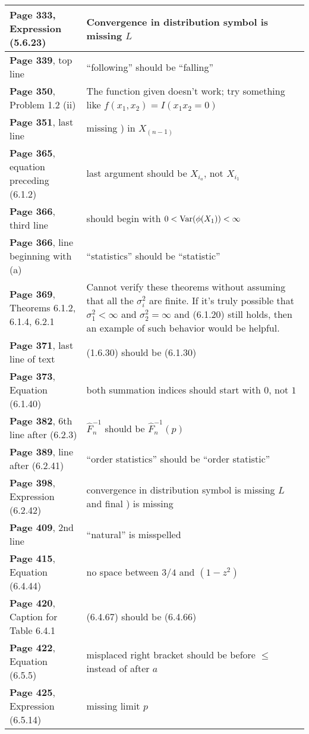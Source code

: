 \documentclass[10pt, a4paper]{article}
\begin{document}
\begin{longtable}{|R{.40\textwidth}|R{.55\textwidth}|}
\textbf{Page 333}, Expression (5.6.23) & Convergence in distribution symbol is missing $L$ \\ \hline
\textbf{Page 339}, top line & ``following'' should be ``falling'' \\ \hline
\textbf{Page 350}, Problem 1.2 (ii) & The function given doesn't work; try something like $f(x_1,x_2)=I(x_1x_2=0)$ \\ \hline
\textbf{Page 351}, last line & missing ) in $X_{(n-1)}$ \\ \hline
\textbf{Page 365}, equation preceding (6.1.2) & last argument should be $X_{i_a}$, not $X_{i_1}$ \\ \hline
\textbf{Page 366}, third line & should begin with $0< {\rm Var}(\phi(X_1))<\infty$ \\ \hline
\textbf{Page 366}, line beginning with (a) & ``statistics'' should be ``statistic'' \\ \hline
\textbf{Page 369}, Theorems 6.1.2, 6.1.4, 6.2.1 & Cannot verify these theorems without assuming that all the $\sigma^2_i$ are finite. If it’s truly possible that $\sigma_1^2<\infty$ and $\sigma_2^2=\infty$ and (6.1.20) still holds, then an example of such behavior would be helpful. \\ \hline
\textbf{Page 371}, last line of text & (1.6.30) should be (6.1.30) \\ \hline
\textbf{Page 373}, Equation (6.1.40) & both summation indices should start with $0$, not $1$ \\ \hline
\textbf{Page 382}, 6th line after (6.2.3) & $\widehat{F}_n^{-1}$ should be $\widehat{F}_n^{-1}(p)$ \\ \hline
\textbf{Page 389}, line after (6.2.41) & ``order statistics'' should be ``order statistic'' \\ \hline
\textbf{Page 398}, Expression (6.2.42) & convergence in distribution symbol is missing $L$ and final ) is missing \\ \hline
\textbf{Page 409}, 2nd line & ``natural'' is misspelled \\ \hline
\textbf{Page 415}, Equation (6.4.44) & no space between $3/4$ and $(1 - z^2)$ \\ \hline
\textbf{Page 420}, Caption for Table 6.4.1 & (6.4.67) should be (6.4.66) \\ \hline
\textbf{Page 422}, Equation (6.5.5) & misplaced right bracket should be before $\leq$ instead of after $a$ \\ \hline
\textbf{Page 425}, Expression (6.5.14) & missing limit $p$ \\ \hline

\end{longtable}
\end{document}
